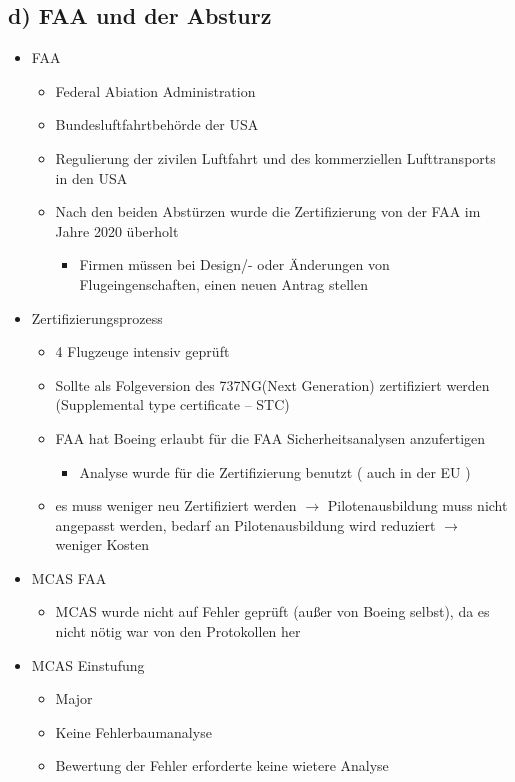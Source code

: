 \documentclass[11pt,a4paper]{article}
\begin{document}
\subsection*{d) FAA und der Absturz}
\begin{itemize}
\item FAA
\begin{itemize}
\item Federal Abiation Administration
\item Bundesluftfahrtbehörde der USA
\item Regulierung der zivilen Luftfahrt und des kommerziellen Lufttransports in den USA
\item Nach den beiden Abstürzen wurde die Zertifizierung von der FAA im Jahre 2020 überholt\cite{Boeing-737-MAX}
\begin{itemize}
\item Firmen müssen bei Design/- oder Änderungen von Flugeingenschaften, einen neuen Antrag stellen
\end{itemize} 
\end{itemize}
\item Zertifizierungsprozess
\begin{itemize}
\item 4 Flugzeuge intensiv geprüft
\item Sollte als Folgeversion des 737NG(Next Generation) zertifiziert werden (Supplemental type certificate – STC)
\item FAA hat Boeing erlaubt für die FAA Sicherheitsanalysen anzufertigen\cite{B-flawd-analysis}
\begin{itemize}
\item Analyse wurde für die Zertifizierung benutzt ( auch in der EU )
\end{itemize}
\item es muss weniger neu Zertifiziert werden $\longrightarrow$ Pilotenausbildung muss nicht angepasst werden, bedarf an Pilotenausbildung wird reduziert $\longrightarrow$ weniger Kosten
\end{itemize}

	\item MCAS FAA
	\begin{itemize}
		\item MCAS wurde nicht auf Fehler geprüft (außer von Boeing selbst), da es nicht nötig war von den Protokollen her
	\end{itemize}
	\item MCAS Einstufung
	\begin{itemize}
		\item Major
		\item Keine Fehlerbaumanalyse
		\item Bewertung der Fehler erforderte keine wietere Analyse
	\end{itemize}
\end{itemize}
\end{document}
